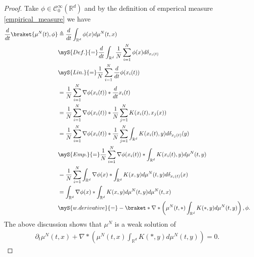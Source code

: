 \begin{proof}
	Take $\phi  \in  \mathcal{C}_0^{\infty}(\mathbb{R}^{d} ) $ and by the definition of emperical measure \autoref{empirical_measure} we have
	\begin{align*}
		\frac{d}{dt} \braket{\mu^N(t),\phi } & \triangleq \frac{d}{dt} \int_{\mathbb{R}^{d} } \phi(x) d\mu^N(t,x)                                                                   \\
		                                     & \myS{Def.}{=} \frac{d}{dt} \int_{\mathbb{R}^{d} } \frac{1}{N} \sum_{i=1}^{N} \phi(x)d\delta_{x_{i}(t)}                               \\
		                                     & \myS{Lin.}{=} \frac{1}{N} \sum_{i=1}^{N}  \frac{d}{dt} \phi (x_i(t))                                                                 \\
		                                     & = \frac{1}{N} \sum_{i=1}^{N} \nabla \phi(x_i(t)) *\frac{d}{dt} x_i(t)                                                                \\
		                                     & = \frac{1}{N} \sum_{i=1}^{N} \nabla \phi(x_i(t)) *\frac{1}{N}\sum_{j=1}^{N} K(x_{i}(t),x_{j}(x))                                     \\
		                                     & = \frac{1}{N} \sum_{i=1}^{N} \nabla \phi(x_i(t)) *\frac{1}{N}\sum_{j=1}^{N} \int_{\mathbb{R}^{d}} K(x_{i}(t),y) d \delta_{x_j(t)}(y) \\
		                                     & \myS{Emp.}{=}  \frac{1}{N} \sum_{i=1}^{N} \nabla \phi(x_i(t)) * \int_{\mathbb{R}^{d}} K(x_{i}(t),y) d\mu^{N}(t,y)                    \\
		                                     & = \frac{1}{N} \sum_{i=1}^{N} \int_{\mathbb{R}^{d} } \nabla \phi(x) * \int_{\mathbb{R}^{d} } K(x,y) d\mu^N(t,y) d\delta_{x_i(t)}(x)   \\
		                                     & = \int_{\mathbb{R}^{d} } \nabla \phi (x) * \int_{\mathbb{R}^{d} } K(x,y) d\mu^N(t,y)d\mu^N(t,x)                                      \\
		                                     & \myS{w. derivative}{=} -\braket*{\nabla*\left(\mu^N(t,*)\int_{\mathbb{R}^{d}}K(*,y) d\mu^N(t,y) \right),\phi }
		.\end{align*}
	The above discussion shows that $\mu^N$ is a weak solution of
	\begin{align*}
		\partial_t \mu^N(t,x) + \nabla * \left( \mu^N(t,x) \int_{\mathbb{R}^{d} } K(*,y) d\mu^N(t,y) \right)  = 0
		.\end{align*}
\end{proof}

